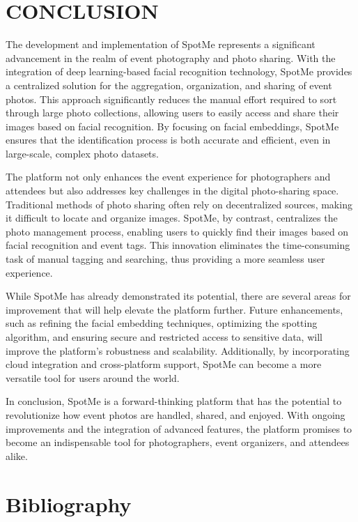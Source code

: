 \documentclass[12pt,a4paper]{report}
\begin{document}
\newpage

\chapter{CONCLUSION}

The development and implementation of SpotMe represents a significant advancement in the realm of event photography and photo sharing. With the integration of deep learning-based facial recognition technology, SpotMe provides a centralized solution for the aggregation, organization, and sharing of event photos. This approach significantly reduces the manual effort required to sort through large photo collections, allowing users to easily access and share their images based on facial recognition. By focusing on facial embeddings, SpotMe ensures that the identification process is both accurate and efficient, even in large-scale, complex photo datasets.

The platform not only enhances the event experience for photographers and attendees but also addresses key challenges in the digital photo-sharing space. Traditional methods of photo sharing often rely on decentralized sources, making it difficult to locate and organize images. SpotMe, by contrast, centralizes the photo management process, enabling users to quickly find their images based on facial recognition and event tags. This innovation eliminates the time-consuming task of manual tagging and searching, thus providing a more seamless user experience.

While SpotMe has already demonstrated its potential, there are several areas for improvement that will help elevate the platform further. Future enhancements, such as refining the facial embedding techniques, optimizing the spotting algorithm, and ensuring secure and restricted access to sensitive data, will improve the platform’s robustness and scalability. Additionally, by incorporating cloud integration and cross-platform support, SpotMe can become a more versatile tool for users around the world. 


In conclusion, SpotMe is a forward-thinking platform that has the potential to revolutionize how event photos are handled, shared, and enjoyed. With ongoing improvements and the integration of advanced features, the platform promises to become an indispensable tool for photographers, event organizers, and attendees alike.



\newpage

\chapter{Bibliography}
\end{document}
